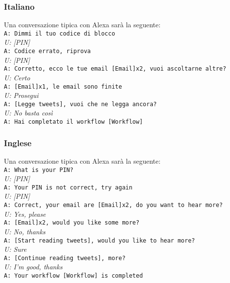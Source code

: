 \subsubsection{Italiano}
Una conversazione tipica con Alexa sarà la seguente: \\
\newline
\texttt{A: Dimmi il tuo codice di blocco} \\
\textit{U: [PIN]} \\
\texttt{A: Codice errato, riprova} \\
\textit{U: [PIN]} \\
\texttt{A: Corretto, ecco le tue email [Email]x2, vuoi ascoltarne altre?}\\
\textit{U: Certo}\\
\texttt{A: [Email]x1, le email sono finite}\\
\textit{U: Prosegui}\\
\texttt{A: [Legge tweets], vuoi che ne legga ancora?}\\
\textit{U: No basta così}\\
\texttt{A: Hai completato il workflow [Workflow]}

\subsubsection{Inglese}
Una conversazione tipica con Alexa sarà la seguente:\\
\newline
\texttt{A: What is your PIN?} \\
\textit{U: [PIN]} \\
\texttt{A: Your PIN is not correct, try again} \\
\textit{U: [PIN]} \\
\texttt{A: Correct, your email are [Email]x2, do you want to hear more?}\\
\textit{U: Yes, please} \\
\texttt{A: [Email]x2, would you like some more?} \\
\textit{U: No, thanks} \\
\texttt{A: [Start reading tweets], would you like to hear more?}\\
\textit{U: Sure} \\
\texttt{A: [Continue reading tweets], more?}\\
\textit{U: I'm good, thanks} \\
\texttt{A: Your workflow [Workflow] is completed}

